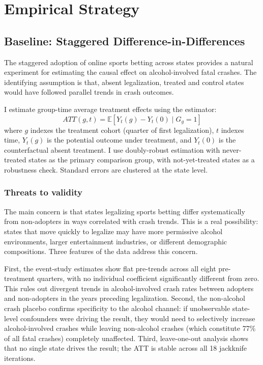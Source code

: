 \documentclass[12pt]{article}
\newcommand{\E}{\mathbb{E}}
\begin{document}
\section{Empirical Strategy}

\subsection{Baseline: Staggered Difference-in-Differences}

The staggered adoption of online sports betting across states provides a natural experiment for estimating the causal effect on alcohol-involved fatal crashes. The identifying assumption is that, absent legalization, treated and control states would have followed parallel trends in crash outcomes.

I estimate group-time average treatment effects using the \citet{CallawayAndSantAnna2021} estimator:
\begin{equation}
ATT(g,t) = \E[Y_t(g) - Y_t(0) \mid G_g = 1]
\end{equation}
where $g$ indexes the treatment cohort (quarter of first legalization), $t$ indexes time, $Y_t(g)$ is the potential outcome under treatment, and $Y_t(0)$ is the counterfactual absent treatment. I use doubly-robust estimation with never-treated states as the primary comparison group, with not-yet-treated states as a robustness check. Standard errors are clustered at the state level.

\subsubsection*{Threats to validity} The main concern is that states legalizing sports betting differ systematically from non-adopters in ways correlated with crash trends. This is a real possibility: states that move quickly to legalize may have more permissive alcohol environments, larger entertainment industries, or different demographic compositions. Three features of the data address this concern.

First, the event-study estimates show flat pre-trends across all eight pre-treatment quarters, with no individual coefficient significantly different from zero. This rules out divergent trends in alcohol-involved crash rates between adopters and non-adopters in the years preceding legalization. Second, the non-alcohol crash placebo confirms specificity to the alcohol channel: if unobservable state-level confounders were driving the result, they would need to selectively increase alcohol-involved crashes while leaving non-alcohol crashes (which constitute 77\% of all fatal crashes) completely unaffected. Third, leave-one-out analysis shows that no single state drives the result; the ATT is stable across all 18 jackknife iterations.
\end{document}
